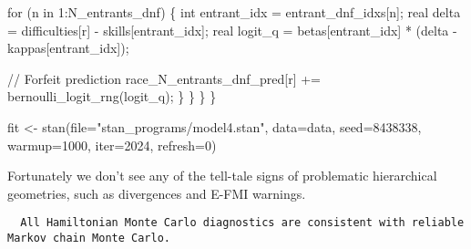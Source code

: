\documentclass[
  letterpaper,
  DIV=11,
  numbers=noendperiod]{scrartcl}
\newenvironment{Shaded}{\begin{snugshade}}{\end{snugshade}}
\newcommand{\AttributeTok}[1]{\textcolor[rgb]{0.40,0.45,0.13}{#1}}
\newcommand{\CommentTok}[1]{\textcolor[rgb]{0.37,0.37,0.37}{#1}}
\newcommand{\ControlFlowTok}[1]{\textcolor[rgb]{0.00,0.23,0.31}{#1}}
\newcommand{\DataTypeTok}[1]{\textcolor[rgb]{0.68,0.00,0.00}{#1}}
\newcommand{\DecValTok}[1]{\textcolor[rgb]{0.68,0.00,0.00}{#1}}
\newcommand{\FunctionTok}[1]{\textcolor[rgb]{0.28,0.35,0.67}{#1}}
\newcommand{\NormalTok}[1]{\textcolor[rgb]{0.00,0.23,0.31}{#1}}
\newcommand{\OtherTok}[1]{\textcolor[rgb]{0.00,0.23,0.31}{#1}}
\newcommand{\SpecialCharTok}[1]{\textcolor[rgb]{0.37,0.37,0.37}{#1}}
\newcommand{\StringTok}[1]{\textcolor[rgb]{0.13,0.47,0.30}{#1}}
\begin{document}
\begin{codelisting}
\begin{Shaded}
\begin{Highlighting}[]
      \ControlFlowTok{for}\NormalTok{ (n }\ControlFlowTok{in} \DecValTok{1}\NormalTok{:N\_entrants\_dnf) \{}
        \DataTypeTok{int}\NormalTok{ entrant\_idx = entrant\_dnf\_idxs[n];}
        \DataTypeTok{real}\NormalTok{ delta = difficulties[r] {-} skills[entrant\_idx];}
        \DataTypeTok{real}\NormalTok{ logit\_q = betas[entrant\_idx] * (delta {-} kappas[entrant\_idx]);}

        \CommentTok{// Forfeit prediction}
\NormalTok{        race\_N\_entrants\_dnf\_pred[r] += bernoulli\_logit\_rng(logit\_q);}
\NormalTok{      \}}
\NormalTok{    \}}
\NormalTok{  \}}
\NormalTok{\}}
\end{Highlighting}
\end{Shaded}

\end{codelisting}

\begin{Shaded}
\begin{Highlighting}[]
\NormalTok{fit }\OtherTok{\textless{}{-}} \FunctionTok{stan}\NormalTok{(}\AttributeTok{file=}\StringTok{"stan\_programs/model4.stan"}\NormalTok{,}
            \AttributeTok{data=}\NormalTok{data, }\AttributeTok{seed=}\DecValTok{8438338}\NormalTok{,}
            \AttributeTok{warmup=}\DecValTok{1000}\NormalTok{, }\AttributeTok{iter=}\DecValTok{2024}\NormalTok{, }\AttributeTok{refresh=}\DecValTok{0}\NormalTok{)}
\end{Highlighting}
\end{Shaded}

Fortunately we don't see any of the tell-tale signs of problematic
hierarchical geometries, such as divergences and E-FMI warnings.

\begin{Shaded}
\end{Shaded}

\begin{verbatim}
  All Hamiltonian Monte Carlo diagnostics are consistent with reliable
Markov chain Monte Carlo.
\end{verbatim}
\end{document}
